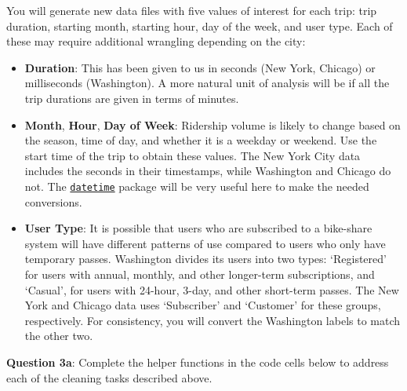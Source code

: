 \documentclass[11pt]{article}
\providecommand{\tightlist}{%
      \setlength{\itemsep}{0pt}\setlength{\parskip}{0pt}}
\begin{document}
You will generate new data files with five values of interest for each
trip: trip duration, starting month, starting hour, day of the week, and
user type. Each of these may require additional wrangling depending on
the city:

\begin{itemize}
\tightlist
\item
  \textbf{Duration}: This has been given to us in seconds (New York,
  Chicago) or milliseconds (Washington). A more natural unit of analysis
  will be if all the trip durations are given in terms of minutes.
\item
  \textbf{Month}, \textbf{Hour}, \textbf{Day of Week}: Ridership volume
  is likely to change based on the season, time of day, and whether it
  is a weekday or weekend. Use the start time of the trip to obtain
  these values. The New York City data includes the seconds in their
  timestamps, while Washington and Chicago do not. The
  \href{https://docs.python.org/3/library/datetime.html}{\texttt{datetime}}
  package will be very useful here to make the needed conversions.
\item
  \textbf{User Type}: It is possible that users who are subscribed to a
  bike-share system will have different patterns of use compared to
  users who only have temporary passes. Washington divides its users
  into two types: `Registered' for users with annual, monthly, and other
  longer-term subscriptions, and `Casual', for users with 24-hour,
  3-day, and other short-term passes. The New York and Chicago data uses
  `Subscriber' and `Customer' for these groups, respectively. For
  consistency, you will convert the Washington labels to match the other
  two.
\end{itemize}

\textbf{Question 3a}: Complete the helper functions in the code cells
below to address each of the cleaning tasks described above.
\end{document}
